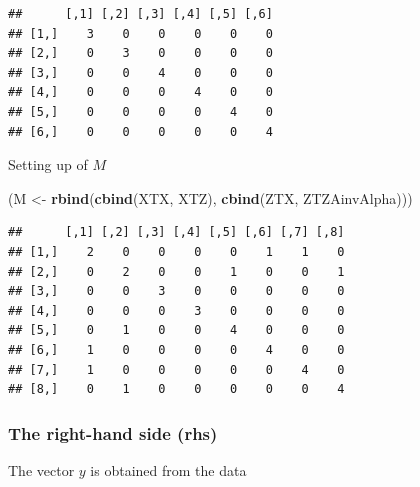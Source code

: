 \documentclass[]{article}
\newenvironment{Shaded}{\begin{snugshade}}{\end{snugshade}}
\newcommand{\KeywordTok}[1]{\textcolor[rgb]{0.13,0.29,0.53}{\textbf{#1}}}
\newcommand{\StringTok}[1]{\textcolor[rgb]{0.31,0.60,0.02}{#1}}
\newcommand{\OperatorTok}[1]{\textcolor[rgb]{0.81,0.36,0.00}{\textbf{#1}}}
\newcommand{\NormalTok}[1]{#1}
\begin{document}
\begin{Shaded}
\end{Shaded}

\begin{verbatim}
##      [,1] [,2] [,3] [,4] [,5] [,6]
## [1,]    3    0    0    0    0    0
## [2,]    0    3    0    0    0    0
## [3,]    0    0    4    0    0    0
## [4,]    0    0    0    4    0    0
## [5,]    0    0    0    0    4    0
## [6,]    0    0    0    0    0    4
\end{verbatim}

Setting up of \(M\)

\begin{Shaded}
\begin{Highlighting}[]
\NormalTok{(M <-}\StringTok{ }\KeywordTok{rbind}\NormalTok{(}\KeywordTok{cbind}\NormalTok{(XTX, XTZ), }\KeywordTok{cbind}\NormalTok{(ZTX, ZTZAinvAlpha)))}
\end{Highlighting}
\end{Shaded}

\begin{verbatim}
##      [,1] [,2] [,3] [,4] [,5] [,6] [,7] [,8]
## [1,]    2    0    0    0    0    1    1    0
## [2,]    0    2    0    0    1    0    0    1
## [3,]    0    0    3    0    0    0    0    0
## [4,]    0    0    0    3    0    0    0    0
## [5,]    0    1    0    0    4    0    0    0
## [6,]    1    0    0    0    0    4    0    0
## [7,]    1    0    0    0    0    0    4    0
## [8,]    0    1    0    0    0    0    0    4
\end{verbatim}

\subsubsection{The right-hand side (rhs)}\label{the-right-hand-side-rhs}

The vector \(y\) is obtained from the data

\begin{Shaded}
\end{Shaded}
\end{document}
